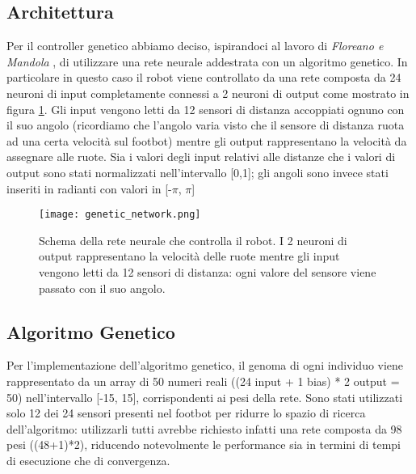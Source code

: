 \documentclass[UTF8]{article}
\begin{document}
\subsection{Architettura}
Per il controller genetico abbiamo deciso, ispirandoci al lavoro di \textit{Floreano e Mandola} \cite{genetic_evolution_nn},  di utilizzare una rete neurale addestrata con un algoritmo genetico. In particolare in questo caso il robot viene controllato da una rete composta da 24 neuroni di input completamente connessi a 2 neuroni di output come mostrato in figura \ref{fig:genetic_network}.
Gli input vengono letti da 12 sensori di distanza accoppiati ognuno con il suo angolo (ricordiamo che l'angolo varia visto che il sensore di distanza ruota ad una certa velocità sul footbot) mentre gli output rappresentano la velocità da assegnare alle ruote. Sia i valori degli input relativi alle distanze che i valori di output sono stati normalizzati nell'intervallo [0,1]; gli angoli sono invece stati inseriti in radianti con valori in [-$\pi$, $\pi$]
\begin{figure}[h]
\centering
\texttt{[image: genetic\_network.png]}
\caption{Schema della rete neurale che controlla il robot. I 2 neuroni di output rappresentano la velocità delle ruote mentre gli input vengono letti da 12 sensori di distanza: ogni valore del sensore viene passato con il suo angolo. }
\label{fig:genetic_network}
\end{figure}

\subsection{Algoritmo Genetico}
Per l'implementazione dell'algoritmo genetico, il genoma di ogni individuo viene rappresentato da un array di 50 numeri reali ((24 input + 1 bias) * 2  output = 50) nell'intervallo [-15, 15], corrispondenti ai pesi della rete. Sono stati utilizzati solo 12 dei 24 sensori presenti nel footbot per ridurre lo spazio di ricerca dell'algoritmo: utilizzarli tutti avrebbe richiesto infatti una rete composta da 98 pesi ((48+1)*2), riducendo notevolmente le performance sia in termini di tempi di esecuzione che di convergenza.
\end{document}
